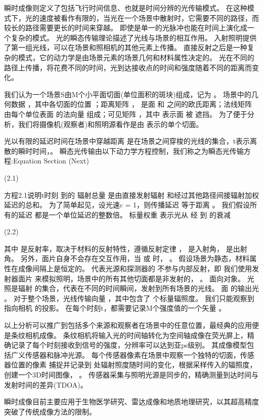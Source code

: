 瞬时成像则定义了包括飞行时间信息、也就是时间分辨的光传输模式。
在这种模式下，光的速度被看作有限的，当光在一个场景中散射时，它需要不同的路径，而较长的路径需要更长的时间来穿越。
即使是单一的光脉冲也能在时间上演化成一个复杂的模式。
光的瞬态传输理论描述了光线与场景的相互作用。
入射照明提供了第一组光线，可以在场景和照相机的其他元素上传播。
直接反射之后是一种复杂的模式，它的动力学是由场景元素的场景几何和材料属性决定的。
光在不同的路径上传播，将花费不同的时间，光到达接收点的时间和强度随着不同的距离而变化。

我们认为一个场景S由M个小平面切面(单位面积的斑块)组成，记为 。
场景中的几何数据 ，其中各切面的位置 ；距离矩阵 ，  是面  和 之间的欧氏距离；法线矩阵 由每个单位表面 的法向量 组成；可见矩阵 ，其中  表示面  被 遮挡。
为了便于分析，我们将摄像机(观察者)和照明源看作是由 表示的单个切面。

光以有限的延迟时间在场景中穿越距离  是在场景之间穿梭的光线的集合，t表示离散的瞬时时间，。
瞬态光传输由以下动力学方程控制，我们称之为瞬态光传输方程:Equation Section (Next)

	  	(2.1)

方程2.1说明t时刻 到的 辐射总量 是由直接发射辐射 和经过其他路径间接辐射加权延迟的总和。
为了简单起见，设光速c = 1，则传播延迟 等于距离 。
我们假设所有的延迟 都是一个单位延迟的整数倍。
标量权重 表示光从  经 到 的衰减
 
	  	(2.2)

其中  是反射率，取决于材料的反射特性，遵循反射定律 ， 是入射角，  是出射角。
另外，面片自身不会存在交互作用，当  或  时， 。
假设场景为静态，材料属性在成像间隔上是恒定的。
代表光源和探测器的 不参与内部反射，即 
我们使用发射器面片 来模拟照明，场景中的所有其他切面都是非发射的，  。
面向对象。
光照是辐射 的集合，代表在不同的时间瞬间，发射到所有场景的光线。
面 的输出光 。
对于整个场景，光线传输向量 ，其中包含了  个标量辐照度。
我们只能观察到 指向相机 的投影。
在每个时刻t，都需要记录M个强度值的一个矢量 。

以上分析可以推广到包括多个来源和观察者在场景中的任意位置，最经典的应用便是条纹相机成像。
条纹相机将输入光的时间轴转化为空间轴成像在荧光屏上，精确记录了每个时刻接收到信号的强度，分辨率可以达到亚ps级别。
其成像模型包括广义传感器和脉冲光源。
每个传感器像素在场景中观察一个独特的切面，传感器位置的像素 捕捉并记录到 处辐射照度随时间的变化，根据采样传入的辐照度，创建一个3D时间图像， 。
传感器采集与照明光源是同步的，精确测量到达时间与发射时间的差异(TDOA)。

瞬时成像目前主要应用于生物医学研究、雷达成像和地质地理研究，以其超高精度突破了传统成像方法的限制。

